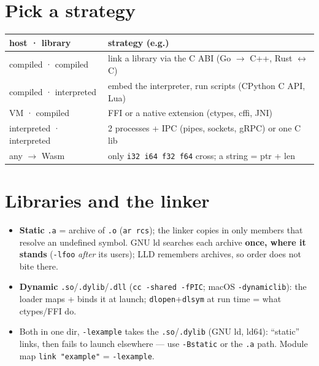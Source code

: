 \documentclass[8pt]{extarticle}
\begin{document}
\begin{multicols}{2}
\raggedright

\section{Pick a strategy}
{\scriptsize\setlength{\tabcolsep}{2.5pt}
\begin{tabular}{@{}L{23mm}L{50mm}@{}}
\toprule
host · library & strategy (e.g.) \\ \midrule
compiled · compiled & link a library via the C ABI (Go $\to$ C++, Rust $\leftrightarrow$ C) \\
compiled · interpreted & embed the interpreter, run scripts (CPython C API, Lua) \\
VM · compiled & FFI or a native extension (ctypes, cffi, JNI) \\
interpreted · interpreted & 2 processes + IPC (pipes, sockets, gRPC) or one C lib \\
any $\to$ Wasm & only \texttt{i32 i64 f32 f64} cross; a string = ptr + len \\
\bottomrule
\end{tabular}}

\section{Libraries and the linker}
\begin{itemize}\raggedright
  \item \textbf{Static} \texttt{.a} = archive of \texttt{.o} (\texttt{ar rcs}); the linker copies in
        only members that resolve an undefined symbol. GNU ld searches each archive
        \textbf{once, where it stands} (\texttt{-lfoo} \emph{after} its users); LLD remembers
        archives, so order does not bite there.
  \item \textbf{Dynamic} \texttt{.so}/\texttt{.dylib}/\texttt{.dll} (\texttt{cc -shared -fPIC};
        macOS \texttt{-dynamiclib}): the loader maps + binds it at launch;
        \texttt{dlopen}+\texttt{dlsym} at run time = what ctypes/FFI do.
  \item Both in one dir, \texttt{-lexample} takes the \texttt{.so}/\texttt{.dylib} (GNU ld, ld64):
        ``static'' links, then fails to launch elsewhere — use \texttt{-Bstatic} or the
        \texttt{.a} path. Module map \texttt{link "example"} = \texttt{-lexample}.
\end{itemize}


\end{multicols}
\end{document}

